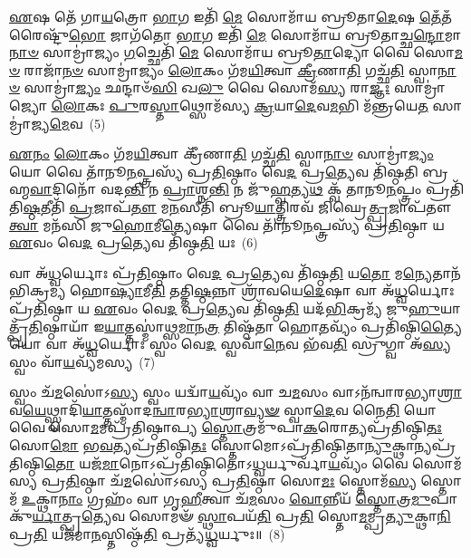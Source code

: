 {\anuvakamend[{𑌯𑌜᳴𑌮𑌾𑌨𑍋 \ul{𑌦𑍀}\-𑌕𑍍𑌷𑌾𑍞 𑌹𑌨𑍍𑌤𑍋॑𑌰𑍍𑌬𑍍𑌰𑌾\-\ul{𑌹𑍍𑌮}\-𑌣𑌾𑌶𑍍𑌚𑌤𑍁᳴𑌰𑍍𑌵𑌿𑍞𑌶𑌤𑌿𑌶𑍍𑌚}]}%

\-\ul{𑌏}\-𑌷 𑌤𑍇᳴ 𑌗𑌾\-\ul{𑌯}\-𑌤𑍍𑌰𑍋 \ul{𑌭𑌾}\-𑌗 𑌇𑌤𑌿᳴ \ul{𑌮𑍇} 𑌸𑍋𑌮𑌾᳴𑌯 𑌬𑍍𑌰𑍂𑌤𑌾\-\ul{𑌦𑍇}\-𑌷 \ul{𑌤𑍇}\-𑌁𑌤𑌁𑌰𑍈𑌷𑍍𑌟𑍁᳴\-\ul{𑌭𑍋} 𑌜𑌾𑌗᳴𑌤𑍋 \ul{𑌭𑌾}\-𑌗 𑌇𑌤𑌿᳴ \ul{𑌮𑍇} 𑌸𑍋𑌮𑌾᳴𑌯 𑌬𑍍𑌰𑍂𑌤𑌾𑌚𑍍𑌛\-\ul{𑌨𑍍𑌦𑍋}\-𑌮𑌾\-\ul{𑌨𑌾}\-\-\ul{𑍞} 𑌸𑌾𑌮𑍍𑌰𑌾॑𑌜𑍍𑌯𑌂 \ul{𑌗}\-𑌚𑍍𑌛𑍇𑌤𑌿᳴ \ul{𑌮𑍇} 𑌸𑍋𑌮𑌾᳴𑌯 𑌬𑍍𑌰𑍂\-\ul{𑌤𑌾}\-𑌦𑍍𑌯𑍋 𑌵𑍈 𑌸𑍋\-\ul{𑌮}\-\-\ul{𑍞} 𑌰𑌾𑌜𑌾᳴\-\ul{𑌨}\-\-\ul{𑍞} 𑌸𑌾𑌮𑍍𑌰𑌾॑𑌜𑍍𑌯𑌂 \ul{𑌲𑍋}\-𑌕𑌂 𑌗᳴𑌮\-\ul{𑌯𑌿}\-𑌤𑍍𑌵𑌾 \ul{𑌕𑍍𑌰𑍀}\-𑌣𑌾\-\ul{𑌤𑌿} 𑌗𑌚𑍍𑌛᳴\-\ul{𑌤𑌿} 𑌸𑍍𑌵𑌾\-\ul{𑌨𑌾}\-\-\ul{𑍞} 𑌸𑌾𑌮𑍍𑌰𑌾॑\-\ul{𑌜𑍍𑌯𑌂} 𑌛𑌨𑍍𑌦𑌾𑍞᳴\-\ul{𑌸𑌿} 𑌖\-\ul{𑌲𑍁} 𑌵𑍈 𑌸𑍋𑌮᳴\-\ul{𑌸𑍍𑌯} 𑌰𑌾\-\ul{𑌜𑍍𑌞𑌃} 𑌸𑌾𑌮𑍍𑌰𑌾॑𑌜𑍍𑌯𑍋 \ul{𑌲𑍋}\-𑌕𑌃 \ul{𑌪𑍁}\-𑌰\-\ul{𑌸𑍍𑌤𑌾}\-𑌥𑍍𑌸𑍋𑌮᳴𑌸𑍍𑌯 \ul{𑌕𑍍𑌰}\-𑌯𑌾\-\ul{𑌦𑍇}\-𑌵\-\ul{𑌮}\-𑌭𑌿 𑌮᳴𑌨𑍍𑌤𑍍𑌰𑌯𑍇\-\ul{𑌤} 𑌸𑌾𑌮𑍍𑌰𑌾॑𑌜𑍍𑌯\-\ul{𑌮𑍇}\-𑌵~(5)

\-\ul{𑌏}\-\-\ul{𑌨𑌂} \ul{𑌲𑍋}\-𑌕𑌂 𑌗᳴𑌮\-\ul{𑌯𑌿}\-𑌤𑍍𑌵𑌾 𑌕𑍍𑌰𑍀᳴𑌣𑌾\-\ul{𑌤𑌿} 𑌗𑌚𑍍𑌛᳴\-\ul{𑌤𑌿} 𑌸𑍍𑌵𑌾\-\ul{𑌨𑌾}\-\-\ul{𑍞} 𑌸𑌾𑌮𑍍𑌰𑌾॑\-\ul{𑌜𑍍𑌯𑌂} 𑌯𑍋 𑌵𑍈 𑌤𑌾᳴𑌨𑍂\-\ul{𑌨}\-𑌪𑍍𑌤𑍍𑌰𑌸𑍍𑌯᳴ 𑌪𑍍𑌰\-\ul{𑌤𑌿}\-𑌷𑍍𑌠𑌾𑌂 𑌵𑍇\-\ul{𑌦} 𑌪𑍍𑌰\-\ul{𑌤𑍍𑌯𑍇}\-𑌵 𑌤𑌿᳴𑌷𑍍𑌠𑌤𑌿 𑌬𑍍𑌰𑌹𑍍𑌮\-\ul{𑌵𑌾}\-𑌦𑌿𑌨𑍋᳴ 𑌵𑌦\-\ul{𑌨𑍍𑌤𑌿} 𑌨 \ul{𑌪𑍍𑌰𑌾}\-𑌶𑍍𑌨\-\ul{𑌨𑍍𑌤𑌿} 𑌨 𑌜𑍁᳴\-\ul{𑌹𑍍𑌵}\-𑌤𑍍𑌯\-\ul{𑌥} 𑌕𑍍𑌵᳴ 𑌤𑌾𑌨𑍂\-\ul{𑌨}\-𑌪𑍍𑌤𑍍𑌰𑌂 𑌪𑍍𑌰𑌤𑌿᳴ 𑌤𑌿\-\ul{𑌷𑍍𑌠}\-𑌤𑍀𑌤𑌿᳴ \ul{𑌪𑍍𑌰}\-𑌜𑌾𑌪᳴\-\ul{𑌤𑍗} 𑌮\-\ul{𑌨}\-𑌸𑍀𑌤𑌿᳴ 𑌬𑍍𑌰𑍂\-\ul{𑌯𑌾}\-𑌤𑍍𑌤𑍍𑌰𑌿𑌰𑌵᳴ 𑌜𑌿𑌘𑍍𑌰𑍇\-\ul{𑌤𑍍𑌪𑍍𑌰}\-𑌜𑌾𑌪᳴𑌤𑍗 \ul{𑌤𑍍𑌵𑌾} 𑌮𑌨᳴𑌸𑌿 𑌜𑍁\-\ul{𑌹𑍋}\-𑌮𑍀\-\ul{𑌤𑍍𑌯𑍇}\-𑌷𑌾 𑌵𑍈 𑌤𑌾᳴𑌨𑍂\-\ul{𑌨}\-𑌪𑍍𑌤𑍍𑌰𑌸𑍍𑌯᳴ 𑌪𑍍𑌰\-\ul{𑌤𑌿}\-𑌷𑍍𑌠𑌾 𑌯 \ul{𑌏}\-𑌵𑌂 𑌵𑍇\-\ul{𑌦} 𑌪𑍍𑌰\-\ul{𑌤𑍍𑌯𑍇}\-𑌵 𑌤𑌿᳴𑌷𑍍𑌠\-\ul{𑌤𑌿} 𑌯𑌃~(6)

𑌵𑌾 𑌅᳴\-\ul{𑌧𑍍𑌵}\-𑌰𑍍𑌯𑍋𑌃 𑌪𑍍𑌰᳴\-\ul{𑌤𑌿}\-𑌷𑍍𑌠𑌾𑌂 𑌵𑍇\-\ul{𑌦} 𑌪𑍍𑌰\-\ul{𑌤𑍍𑌯𑍇}\-𑌵 𑌤𑌿᳴𑌷𑍍𑌠\-\ul{𑌤𑌿} 𑌯\-\ul{𑌤𑍋} 𑌮\-\ul{𑌨𑍍𑌯𑍇}\-𑌤𑌾𑌨᳴𑌭𑌿𑌕𑍍𑌰𑌮𑍍𑌯 𑌹𑍋\-\ul{𑌷𑍍𑌯𑌾}\-𑌮𑍀\-\ul{𑌤𑌿} 𑌤𑌤𑍍𑌤𑌿\-\ul{𑌷𑍍𑌠}\-𑌨𑍍𑌨𑌾 𑌶𑍍𑌰𑌾᳴𑌵𑌯𑍇\-\ul{𑌦𑍇}\-𑌷𑌾 𑌵𑌾 𑌅᳴\-\ul{𑌧𑍍𑌵}\-𑌰𑍍𑌯𑍋𑌃 𑌪𑍍𑌰᳴\-\ul{𑌤𑌿}\-𑌷𑍍𑌠𑌾 𑌯 \ul{𑌏}\-𑌵𑌂 𑌵𑍇\-\ul{𑌦} 𑌪𑍍𑌰\-\ul{𑌤𑍍𑌯𑍇}\-𑌵 𑌤𑌿᳴𑌷𑍍𑌠\-\ul{𑌤𑌿} 𑌯𑌦᳴\-\ul{𑌭𑌿}\-𑌕𑍍𑌰𑌮𑍍𑌯᳴ 𑌜𑍁\-\ul{𑌹𑍁}\-𑌯𑌾𑌤𑍍𑌪𑍍𑌰᳴\-\ul{𑌤𑌿}\-𑌷𑍍𑌠𑌾𑌯𑌾᳴ 𑌇\-\ul{𑌯𑌾}\-𑌤𑍍𑌤𑌸𑍍𑌮𑌾॑𑌥𑍍𑌸\-\ul{𑌮𑌾}\-𑌨\-\ul{𑌤𑍍𑌰} 𑌤𑌿𑌷𑍍𑌠᳴𑌤𑌾 𑌹𑍋\-\ul{𑌤}\-𑌵𑍍𑌯𑌂᳴ 𑌪𑍍𑌰𑌤𑌿᳴𑌷𑍍𑌠𑌿\-\ul{𑌤𑍍𑌯𑍈} 𑌯𑍋 𑌵𑌾 𑌅᳴\-\ul{𑌧𑍍𑌵}\-𑌰𑍍𑌯𑍋𑌃 𑌸𑍍𑌵𑌂 𑌵𑍇\-\ul{𑌦} 𑌸𑍍𑌵𑌵𑌾᳴\-\ul{𑌨𑍇}\-𑌵 𑌭᳴𑌵\-\ul{𑌤𑌿} 𑌸𑍍𑌰𑍁𑌗𑍍𑌵𑌾 𑌅᳴\-\ul{𑌸𑍍𑌯} 𑌸𑍍𑌵𑌂 𑌵𑌾᳴\-\ul{𑌯}\-𑌵𑍍𑌯᳴𑌮𑌸𑍍𑌯~(7)

𑌸𑍍𑌵𑌂 𑌚᳴\-\ul{𑌮}\-𑌸𑍋॑\-𑌽\-\ul{𑌸𑍍𑌯} 𑌸𑍍𑌵𑌂 𑌯𑌦𑍍𑌵𑌾᳴\-\ul{𑌯}\-𑌵𑍍𑌯𑌂᳴ 𑌵𑌾 𑌚\-\ul{𑌮}\-𑌸𑌂 𑌵𑌾\-𑌽𑌨᳴𑌨𑍍𑌵𑌾𑌰𑌭𑍍𑌯𑌾\-\ul{𑌶𑍍𑌰𑌾}\-𑌵\-\ul{𑌯𑍇}\-𑌥𑍍𑌸𑍍𑌵𑌾𑌦𑌿᳴\-\ul{𑌯𑌾}\-𑌤𑍍𑌤𑌸𑍍𑌮𑌾᳴𑌦\-\ul{𑌨𑍍𑌵𑌾}\-𑌰\-\ul{𑌭𑍍𑌯𑌾}\-𑌶𑍍𑌰𑌾\-\ul{𑌵𑍍𑌯}\-\-\ul{𑍟} 𑌸𑍍𑌵𑌾\-\ul{𑌦𑍇}\-𑌵 𑌨𑍈\-\ul{𑌤𑌿} 𑌯𑍋 𑌵𑍈 𑌸𑍋\-\ul{𑌮}\-𑌮𑌪𑍍𑌰᳴𑌤𑌿𑌷𑍍𑌠𑌾𑌪𑍍𑌯 \ul{𑌸𑍍𑌤𑍋}\-𑌤𑍍𑌰𑌮𑍁᳴𑌪𑌾\-\ul{𑌕}\-𑌰𑍋𑌤𑍍𑌯𑌪𑍍𑌰᳴𑌤𑌿𑌷𑍍𑌠𑌿\-\ul{𑌤𑌃} 𑌸𑍋\-\ul{𑌮𑍋} 𑌭\-\ul{𑌵}\-𑌤𑍍𑌯𑌪𑍍𑌰᳴𑌤𑌿𑌷𑍍𑌠𑌿\-\ul{𑌤𑌃} 𑌸𑍍𑌤𑍋𑌮𑍋\-𑌽𑌪𑍍𑌰᳴𑌤𑌿𑌷𑍍𑌠𑌿𑌤𑌾\-\ul{𑌨𑍍𑌯𑍁}\-𑌕𑍍𑌥𑌾𑌨𑍍𑌯𑌪𑍍𑌰᳴𑌤𑌿𑌷𑍍𑌠𑌿\-\ul{𑌤𑍋} 𑌯𑌜᳴\-\ul{𑌮𑌾}\-𑌨𑍋\-𑌽𑌪𑍍𑌰᳴𑌤𑌿𑌷𑍍𑌠𑌿𑌤𑍋\-𑌽\-\ul{𑌧𑍍𑌵}\-𑌰𑍍𑌯𑍁𑌰𑍍𑌵𑌾᳴\-\ul{𑌯}\-𑌵𑍍𑌯𑌂᳴ 𑌵𑍈 𑌸𑍋𑌮᳴𑌸𑍍𑌯 𑌪𑍍𑌰\-\ul{𑌤𑌿}\-𑌷𑍍𑌠𑌾 𑌚᳴\-\ul{𑌮}\-𑌸𑍋॑\-𑌽𑌸𑍍𑌯 𑌪𑍍𑌰\-\ul{𑌤𑌿}\-𑌷𑍍𑌠𑌾 𑌸𑍋\-\ul{𑌮𑌃} 𑌸𑍍𑌤𑍋𑌮᳴\-\ul{𑌸𑍍𑌯} 𑌸𑍍𑌤𑍋𑌮᳴ \ul{𑌉}\-𑌕𑍍𑌥𑌾\-\ul{𑌨𑌾𑌂} 𑌗𑍍𑌰𑌹𑌂᳴ 𑌵𑌾 𑌗𑍃\-\ul{𑌹𑍀}\-𑌤𑍍𑌵𑌾 𑌚᳴\-\ul{𑌮}\-𑌸𑌂 \ul{𑌵𑍋}\-𑌨𑍍𑌨𑍀𑌯᳴ \ul{𑌸𑍍𑌤𑍋}\-𑌤𑍍𑌰\-\ul{𑌮𑍁}\-𑌪𑌾𑌕𑍁᳴\-\ul{𑌰𑍍𑌯𑌾}\-𑌤𑍍𑌪𑍍𑌰\-\ul{𑌤𑍍𑌯𑍇}\-𑌵 𑌸𑍋𑌮𑍟᳴ \ul{𑌸𑍍𑌥𑌾}\-𑌪𑌯᳴\-\ul{𑌤𑌿} 𑌪𑍍𑌰\-\ul{𑌤𑌿} 𑌸𑍍𑌤𑍋\-\ul{𑌮}\-𑌮𑍍𑌪𑍍𑌰\-\ul{𑌤𑍍𑌯𑍁}\-𑌕𑍍𑌥𑌾\-\ul{𑌨𑌿} 𑌪𑍍𑌰\-\ul{𑌤𑌿} 𑌯𑌜᳴𑌮𑌾\-\ul{𑌨}\-𑌸𑍍𑌤𑌿𑌷𑍍𑌠᳴\-\ul{𑌤𑌿} 𑌪𑍍𑌰𑌤𑍍𑌯᳴\-\ul{𑌧𑍍𑌵}\-𑌰𑍍𑌯𑍁𑌃॥~(8)

